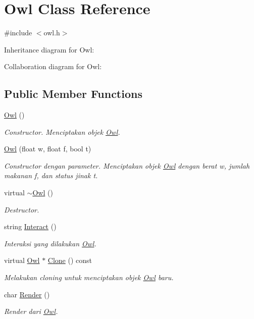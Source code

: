 \hypertarget{classOwl}{}\section{Owl Class Reference}
\label{classOwl}


{\ttfamily \#include $<$owl.\+h$>$}



Inheritance diagram for Owl\+:


Collaboration diagram for Owl\+:
\subsection*{Public Member Functions}
\begin{DoxyCompactItemize}
\item 
\hyperlink{classOwl_a0a5c549eb9ac3099f04dbcea78c79f6a}{Owl} ()
\begin{DoxyCompactList}\small\item\em Constructor. Menciptakan objek \hyperlink{classOwl}{Owl}. \end{DoxyCompactList}\item 
\hyperlink{classOwl_abdec4b1b8d1f146b55175bae78888a1d}{Owl} (float w, float f, bool t)
\begin{DoxyCompactList}\small\item\em Constructor dengan parameter. Menciptakan objek \hyperlink{classOwl}{Owl} dengan berat w, jumlah makanan f, dan status jinak t. \end{DoxyCompactList}\item 
virtual \hyperlink{classOwl_af8238b610fbfd53c4d3153fb2d993ab7}{$\sim$\+Owl} ()
\begin{DoxyCompactList}\small\item\em Destructor. \end{DoxyCompactList}\item 
string \hyperlink{classOwl_ac3c735f8a34b46780a0efd052319e7f3}{Interact} ()
\begin{DoxyCompactList}\small\item\em Interaksi yang dilakukan \hyperlink{classOwl}{Owl}. \end{DoxyCompactList}\item 
virtual \hyperlink{classOwl}{Owl} $\ast$ \hyperlink{classOwl_a585e73d53d76b2db489613b7f0b6eecc}{Clone} () const 
\begin{DoxyCompactList}\small\item\em Melakukan cloning untuk menciptakan objek \hyperlink{classOwl}{Owl} baru. \end{DoxyCompactList}\item 
char \hyperlink{classOwl_ab4ecc1fc8da822f97299709508f7806d}{Render} ()
\begin{DoxyCompactList}\small\item\em Render dari \hyperlink{classOwl}{Owl}. \end{DoxyCompactList}\end{DoxyCompactItemize}
